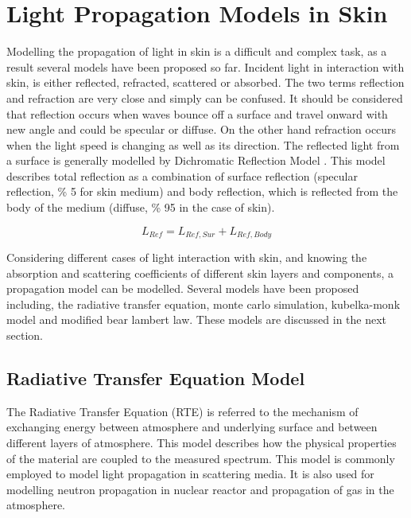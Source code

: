\section{Light Propagation Models in Skin}

Modelling the propagation of light in skin is a difficult and complex task, as a result several models have been proposed so far. 
Incident light in interaction with skin, is either reflected, refracted, scattered or absorbed. The two terms reflection and refraction are very close and simply can be confused. It should be considered that reflection occurs when waves bounce off a surface and travel onward with new angle and could be specular or diffuse. On the other hand refraction occurs when the light speed is changing as well as its direction. 
The reflected light from a surface is generally modelled by Dichromatic Reflection Model \cite{klinker1990physical}. This model describes total reflection as a combination of surface reflection (specular reflection, \% 5 for skin medium) and body reflection, which is reflected from the body of the medium (diffuse, \% 95 in the case of skin).  

	\begin{equation}
	 L_{Ref} = L_{Ref, Sur} + L_{Ref, Body}
	 \label{eq:LRef}
	\end{equation}

Considering different cases of light interaction with skin, and knowing the absorption and scattering coefficients of different skin layers and components, a propagation model can be modelled. Several models have been proposed including, the radiative transfer equation, monte carlo simulation, kubelka-monk model and modified bear lambert law. These models are discussed in the next section.  

\subsection{Radiative Transfer Equation Model}

The Radiative Transfer Equation (RTE) is referred to the mechanism of exchanging energy between atmosphere and underlying surface and between different layers of atmosphere. This model describes how the physical properties of the material are coupled to the measured spectrum. This model is commonly employed to model light propagation in scattering media. It is also used for modelling neutron propagation in nuclear reactor and propagation of gas in the atmosphere. 

